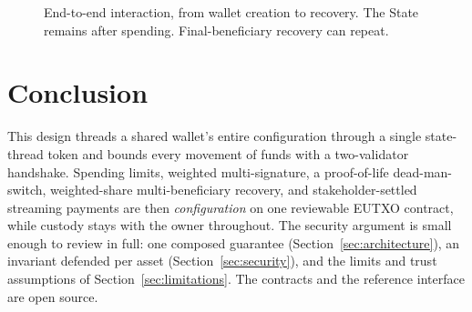 \documentclass[11pt,DIV=11,parskip=half-]{scrartcl}
\begin{document}
\begin{figure}[H]
\centering
{}
\caption{End-to-end interaction, from wallet creation to recovery. The State remains after spending. Final-beneficiary recovery can repeat.} \label{fig:flow}
\end{figure}

\section{Conclusion}
\label{sec:conclusion}

This design threads a shared wallet's entire configuration through a single state-thread token and bounds every movement of funds with a two-validator handshake. Spending limits, weighted multi-signature, a proof-of-life dead-man-switch, weighted-share multi-beneficiary recovery, and stakeholder-settled streaming payments are then \emph{configuration} on one reviewable EUTXO contract, while custody stays with the owner throughout. The security argument is small enough to review in full: one composed guarantee (Section~\ref{sec:architecture}), an invariant defended per asset (Section~\ref{sec:security}), and the limits and trust assumptions of Section~\ref{sec:limitations}. The contracts and the reference interface are open source.
\end{document}
